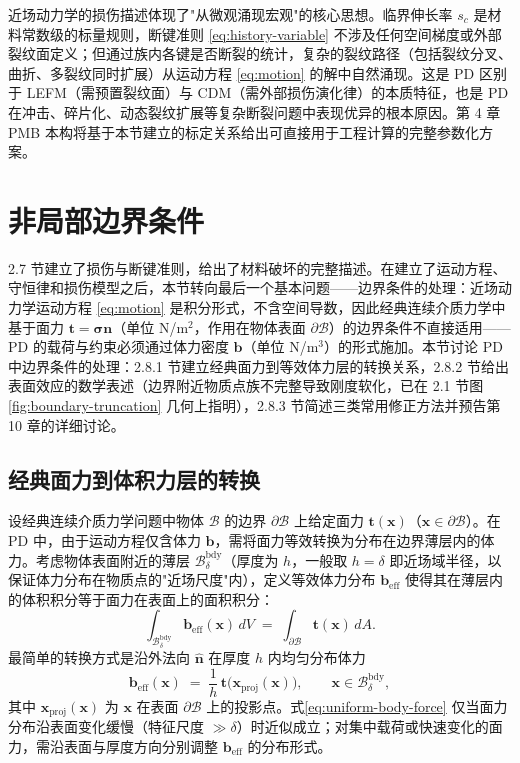 \begin{remark}
  近场动力学的损伤描述体现了"从微观涌现宏观"的核心思想。临界伸长率 $s_c$ 是材料常数级的标量规则，断键准则 \eqref{eq:history-variable} 不涉及任何空间梯度或外部裂纹面定义；但通过族内各键是否断裂的统计，复杂的裂纹路径（包括裂纹分叉、曲折、多裂纹同时扩展）从运动方程 \eqref{eq:motion} 的解中自然涌现。这是 PD 区别于 LEFM（需预置裂纹面）与 CDM（需外部损伤演化律）的本质特征，也是 PD 在冲击、碎片化、动态裂纹扩展等复杂断裂问题中表现优异的根本原因。第 4 章 PMB 本构将基于本节建立的标定关系给出可直接用于工程计算的完整参数化方案。
\end{remark}

\section{非局部边界条件}

2.7 节建立了损伤与断键准则，给出了材料破坏的完整描述。在建立了运动方程、守恒律和损伤模型之后，本节转向最后一个基本问题——边界条件的处理：近场动力学运动方程 \eqref{eq:motion} 是积分形式，不含空间导数，因此经典连续介质力学中基于面力 $\mathbf{t}=\boldsymbol{\sigma}\mathbf{n}$（单位 N/m$^2$，作用在物体表面 $\partial\mathcal{B}$）的边界条件不直接适用——PD 的载荷与约束必须通过体力密度 $\mathbf{b}$（单位 N/m$^3$）的形式施加。本节讨论 PD 中边界条件的处理：2.8.1 节建立经典面力到等效体力层的转换关系，2.8.2 节给出表面效应的数学表述（边界附近物质点族不完整导致刚度软化，已在 2.1 节图\ref{fig:boundary-truncation} 几何上指明），2.8.3 节简述三类常用修正方法并预告第 10 章的详细讨论。

\subsection{经典面力到体积力层的转换}

设经典连续介质力学问题中物体 $\mathcal{B}$ 的边界 $\partial\mathcal{B}$ 上给定面力 $\mathbf{t}(\mathbf{x})$（$\mathbf{x}\in\partial\mathcal{B}$）。在 PD 中，由于运动方程仅含体力 $\mathbf{b}$，需将面力等效转换为分布在边界薄层内的体力。考虑物体表面附近的薄层 $\mathcal{B}_{\delta}^{\text{bdy}}$（厚度为 $h$，一般取 $h=\delta$ 即近场域半径，以保证体力分布在物质点的"近场尺度"内），定义等效体力分布 $\mathbf{b}_{\text{eff}}$ 使得其在薄层内的体积积分等于面力在表面上的面积积分：
\begin{equation}
  \label{eq:force-conversion}
  \int_{\mathcal{B}_{\delta}^{\text{bdy}}} \mathbf{b}_{\text{eff}}(\mathbf{x})\, dV \;=\; \int_{\partial\mathcal{B}} \mathbf{t}(\mathbf{x})\, dA.
\end{equation}
最简单的转换方式是沿外法向 $\hat{\mathbf{n}}$ 在厚度 $h$ 内均匀分布体力
\begin{equation}
  \label{eq:uniform-body-force}
  \mathbf{b}_{\text{eff}}(\mathbf{x}) \;=\; \frac{1}{h}\,\mathbf{t}\bigl(\mathbf{x}_{\text{proj}}(\mathbf{x})\bigr), \qquad \mathbf{x}\in\mathcal{B}_{\delta}^{\text{bdy}},
\end{equation}
其中 $\mathbf{x}_{\text{proj}}(\mathbf{x})$ 为 $\mathbf{x}$ 在表面 $\partial\mathcal{B}$ 上的投影点。式\eqref{eq:uniform-body-force} 仅当面力分布沿表面变化缓慢（特征尺度 $\gg\delta$）时近似成立；对集中载荷或快速变化的面力，需沿表面与厚度方向分别调整 $\mathbf{b}_{\text{eff}}$ 的分布形式。

